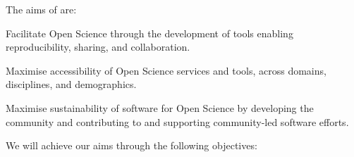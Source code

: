 



\noindent The aims of \TheProject are:

\begin{compactenum}

\item \label{aim:facilitation}
  Facilitate Open Science through the development
  of tools enabling reproducibility, sharing, and collaboration.

\item \label{aim:accessibility}
  Maximise accessibility of Open Science services and tools,
  across domains, disciplines, and demographics.

\item \label{aim:sustainability}
  Maximise sustainability of software for Open Science
  by developing the community and contributing
  to and supporting community-led software efforts.

\end{compactenum}

\noindent We will achieve our aims through the following objectives:

